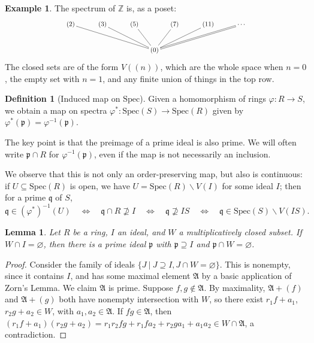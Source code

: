 \documentclass{amsart}[12pt]
\def\fA{\mathfrak A}
\newcommand{\p}{{\mathfrak p}}
\newcommand{\q}{{\mathfrak q}}
\numberwithin{equation}{section}
\theoremstyle{plain} %
\newtheorem{lemma}[equation]{Lemma}
\theoremstyle{definition}
\newtheorem{definition}[equation]{Definition}
\newtheorem{example}[equation]{Example}
\theoremstyle{remark}
\newcommand{\Spec}{\mathrm{Spec}}
\begin{document}
\begin{example} The spectrum of $\mathbb{Z}$ is, as a poset:
\[ \xymatrix@C-1pc{ &&&& & (2) &  & (3) &  & (5) & & (7) & & (11) & & \cdots &&&&& \\ 
&&&& &  & &  & &  & (0)\ar@{-}[lllllu] \ar@{-}[lllu] \ar@{-}[lu] \ar@{-}[ru] \ar@{-}[rrru] \ar@{=}[rrrrru] &&&&& &&&&& }\]
The closed sets are of the form $V((n))$, which are the whole space when $n=0$, the empty set with $n=1$, and any finite union of things in the top row.
\end{example}


\begin{definition}[Induced map on $\Spec$]
	Given a homomorphism of rings $\varphi:R\to S$, we obtain a map on spectra $\varphi^*:\Spec(S)\to\Spec(R)$\index{map on $\Spec$} given by $\varphi^*(\p)=\varphi^{-1}(\p)$.
\end{definition}




The key point is that the preimage of a prime ideal is also prime. 
We will often write $\p \cap R$ for $\varphi^{-1}(\p)$, even if the map is not necessarily an inclusion.

We observe that this is not only an order-preserving map, but also is continuous: if $U\subseteq \Spec(R)$ is open, we have $U=\Spec(R) \smallsetminus V(I)$ for some ideal $I$; then for a prime $\q$ of $S$,
\[\q\in (\varphi^*)^{-1}(U) \quad \Leftrightarrow \quad \q \cap R \not\supseteq I  \quad \Leftrightarrow \quad \q \not\supseteq IS  \quad \Leftrightarrow \quad \q \in \Spec(S) \smallsetminus V(IS).\]

\begin{lemma} Let $R$ be a ring, $I$ an ideal, and $W$ a multiplicatively closed subset. If $W\cap I=\varnothing$, then there is a prime ideal $\p$ with $\p \supseteq I$ and $\p \cap W=\varnothing$.
\end{lemma}
\begin{proof}
	Consider the family of ideals $\{ J \ | \ J \supseteq I, J \cap W=\varnothing\}$. This is nonempty, since it contains $I$, and has some maximal element $\fA$ by a basic application of Zorn's Lemma. We claim $\fA$ is prime. Suppose $f,g\notin \fA$. By maximality, $\fA+(f)$ and $\fA+(g)$ both have nonempty intersection with $W$, so there exist $r_1f+a_1$, $r_2 g+a_2 \in W$, with $a_1,a_2\in \fA$. If $fg\in \fA$, then $(r_1f+a_1)(r_2g+a_2)=r_1 r_2 fg + r_1 f a_2 + r_2 g a_1 + a_1 a_2 \in W \cap \fA$, a contradiction.
\end{proof}
\end{document}
